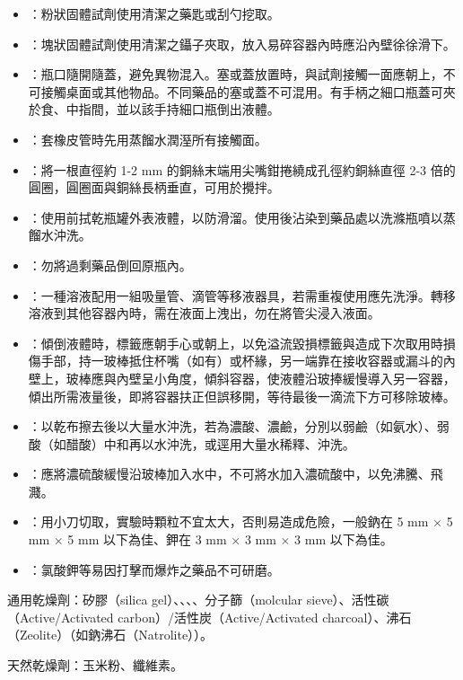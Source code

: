 \documentclass[a4paper,12pt]{article}
\begin{document}
\begin{itemize}
\item {}：粉狀固體試劑使用清潔之藥匙或刮勺挖取。
\item {}：塊狀固體試劑使用清潔之鑷子夾取，放入易碎容器內時應沿內壁徐徐滑下。
\item {}：瓶口隨開隨蓋，避免異物混入。塞或蓋放置時，與試劑接觸一面應朝上，不可接觸桌面或其他物品。不同藥品的塞或蓋不可混用。有手柄之細口瓶蓋可夾於食、中指間，並以該手持細口瓶倒出液體。
\item {}：套橡皮管時先用蒸餾水潤溼所有接觸面。
\item {}：將一根直徑約 1-2 mm 的銅絲末端用尖嘴鉗捲繞成孔徑約銅絲直徑 2-3 倍的圓圈，圓圈面與銅絲長柄垂直，可用於攪拌。
\item {}：使用前拭乾瓶罐外表液體，以防滑溜。使用後沾染到藥品處以洗滌瓶噴以蒸餾水沖洗。
\item {}：勿將過剩藥品倒回原瓶內。
\item {}：一種溶液配用一組吸量管、滴管等移液器具，若需重複使用應先洗淨。轉移溶液到其他容器內時，需在液面上洩出，勿在將管尖浸入液面。
\item {}：傾倒液體時，標籤應朝手心或朝上，以免溢流毀損標籤與造成下次取用時損傷手部，持一玻棒抵住杯嘴（如有）或杯緣，另一端靠在接收容器或漏斗的內壁上，玻棒應與內壁呈小角度，傾斜容器，使液體沿玻捧緩慢導入另一容器，傾出所需液量後，即將容器扶正但誤移開，等待最後一滴流下方可移除玻棒。
\item {}：以乾布擦去後以大量水沖洗，若為濃酸、濃鹼，分別以弱鹼（如氨水）、弱酸（如醋酸）中和再以水沖洗，或逕用大量水稀釋、沖洗。
\item {}：應將濃硫酸緩慢沿玻棒加入水中，不可將水加入濃硫酸中，以免沸騰、飛濺。
\item {}：用小刀切取，實驗時顆粒不宜太大，否則易造成危險，一般鈉在 5 mm $\times$ 5 mm $\times$ 5 mm 以下為佳、鉀在 3 mm $\times$ 3 mm $\times$ 3 mm 以下為佳。
\item {}：氯酸鉀等易因打擊而爆炸之藥品不可研磨。
\end{itemize}
\bit
\item 通用乾燥劑：矽膠（silica gel）、、、、分子篩（molcular sieve）、活性碳（Active/Activated carbon）/活性炭（Active/Activated charcoal）、沸石（Zeolite）（如鈉沸石（Natrolite））。
\item 天然乾燥劑：玉米粉、纖維素。
\end{document}
